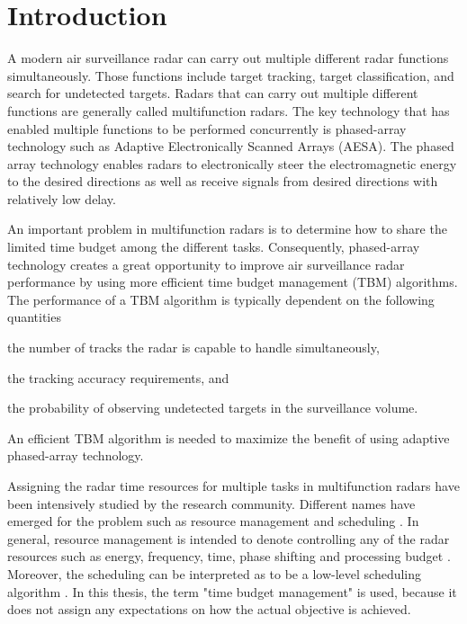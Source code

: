 \documentclass[english, 12pt, a4paper, elec, utf8, a-1b, online]{aaltothesis}
\begin{document}
\cleardoublepage

\section{Introduction}

A modern air surveillance radar can carry out multiple different radar functions simultaneously.
Those functions include target tracking, target classification, and search for undetected targets.
Radars that can carry out multiple different functions are generally called multifunction radars.
The key technology that has enabled multiple functions to be performed concurrently is phased-array technology such as
Adaptive Electronically Scanned Arrays (AESA).
The phased array technology enables radars to electronically steer the electromagnetic energy to the desired directions as well as receive signals from desired directions with relatively low delay.

An important problem in multifunction radars is to determine how to share the limited time budget among the different tasks.
Consequently, phased-array technology creates a great opportunity to improve air surveillance radar performance by using more efficient time budget management (TBM) algorithms.
The performance of a TBM algorithm is typically dependent on the following quantities 
\begin{enumerate*}[label=(\roman*)]
    \item the number of tracks the radar is capable to handle simultaneously,
    \item the tracking accuracy requirements, and
    \item the probability of observing undetected targets in the surveillance volume.
\end{enumerate*}
An efficient TBM algorithm is needed to maximize the benefit of using adaptive phased-array technology.

Assigning the radar time resources for multiple tasks in multifunction radars have been intensively studied by the research community.
Different names have emerged for the problem such as resource management \cite{Wintenby2006, Charlish2015a} and scheduling \cite{Esfahani2012, Byrne2015, Byrne2016, Krishnamurthy1999, Krishnamurthy2001}.
In general, resource management is intended to denote controlling any of the radar resources such as energy, frequency, time, phase shifting and processing budget \cite{Ding2008}.
Moreover, the scheduling can be interpreted as to be a low-level scheduling algorithm \cite{Wintenby2006}.
In this thesis, the term "time budget management" is used, because it does not assign any expectations on how the actual objective is achieved.
\end{document}

